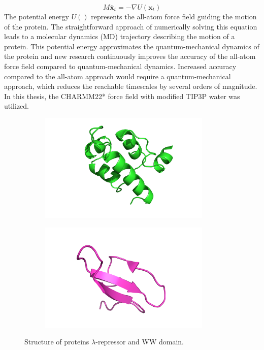 $$M\ddot{\mathbf{x}_{t}}=-\nabla U(\mathbf{x}_{t})$$
The potential energy $U()$ represents the all-atom force field guiding the motion of the protein. The straightforward approach of numerically solving this equation leads to a molecular dynamics (MD) trajectory describing the motion of a protein. This potential energy approximates the quantum-mechanical dynamics of the protein and new research continuously improves the accuracy of the all-atom force field compared to quantum-mechanical dynamics. Increased accuracy compared to the all-atom approach would require a quantum-mechanical approach, which reduces the reachable timescales by several orders of magnitude.  In this thesis, the CHARMM22* force field \cite{Charmm22star} with modified TIP3P water was utilized.

\begin{figure}[H]
  \centering
  \begin{subfigure}[t]{0.45\textwidth}
    \includegraphics[width=0.9\textwidth]{figures3/lambda-repressor.png} 
  \end{subfigure}
  \begin{subfigure}[t]{0.45\textwidth}
    \includegraphics[width=0.9\textwidth]{figures3/ww-domain.png}  
  \end{subfigure}
  \caption{Structure of proteins $\lambda$-repressor and WW domain.}
  \label{fig:proteins}
\end{figure}


